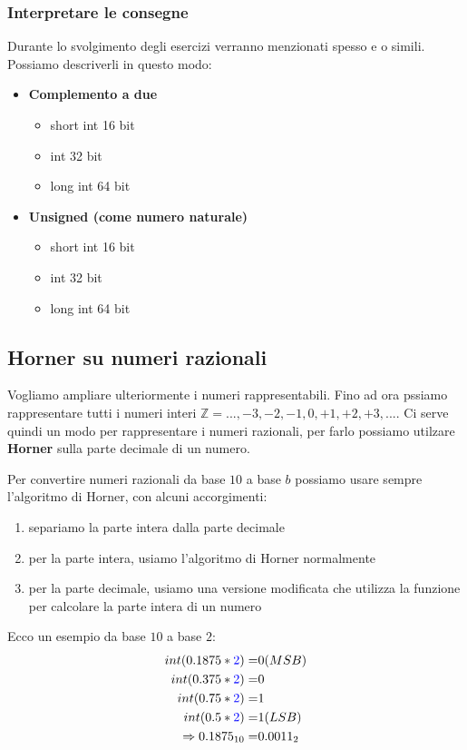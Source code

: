 \documentclass[../main.tex]{subfiles}
\begin{document}
\subsubsection{Interpretare le consegne}
Durante lo svolgimento degli esercizi verranno menzionati spesso  e  o simili. Possiamo 
descriverli in questo modo:
\begin{itemize}
    \item \textbf{Complemento a due}
    \begin{itemize}
        \item short int 16 bit
        \item int 32 bit
        \item long int 64 bit
    \end{itemize}
    \item \textbf{Unsigned (come numero naturale)}
    \begin{itemize}
        \item short int 16 bit
        \item int 32 bit
        \item long int 64 bit
    \end{itemize}
\end{itemize}

\subsection{Horner su numeri razionali}
Vogliamo ampliare ulteriormente i numeri rappresentabili. Fino ad ora pssiamo rappresentare tutti i numeri interi 
$\mathbb{Z}={...,-3,-2,-1,0,+1,+2,+3,...}$. Ci serve quindi un modo per rappresentare i numeri razionali, per farlo possiamo utilzare 
\textbf{Horner} sulla parte decimale di un numero.

Per convertire numeri razionali da base $10$ a base $b$ possiamo usare sempre l'algoritmo di Horner, con alcuni accorgimenti:
\begin{enumerate}
    \item separiamo la parte intera dalla parte decimale
    \item per la parte intera, usiamo l'algoritmo di Horner normalmente
    \item per la parte decimale, usiamo una versione modificata che utilizza la funzione  per calcolare la parte intera di un numero
\end{enumerate}

Ecco un esempio da base $10$ a base \color{blue}$2$\color{black}:
\begin{align*}
    int(0.1875 * \color{blue}2\color{black}) =& 0 (MSB)\\
    int(0.375 * \color{blue}2\color{black}) =& 0\\
    int(0.75 * \color{blue}2\color{black}) =& 1\\
    int(0.5 * \color{blue}2\color{black}) =& 1 (LSB) \\
    \Rightarrow 0.1875_{10} =& 0.0011_2
\end{align*}
\end{document}
